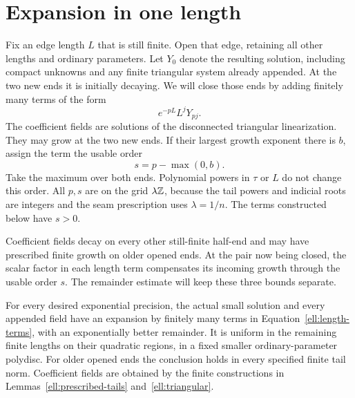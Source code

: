 \section{Expansion in one length}
\label{ell:length-expansion}

Fix an edge length $L$ that is still finite.  Open that edge,
retaining all other lengths and ordinary parameters.  Let $Y_0$
denote the resulting solution, including compact unknowns and
any finite triangular system already appended.  At the two
new ends it is initially decaying.  We will close those ends
by adding finitely many terms of the form
\begin{equation}
                       e^{-pL}L^jY_{pj}.
 \label{ell:length-terms}
\end{equation}
The coefficient fields are solutions of the disconnected
triangular linearization.  They may grow at the two new ends.
If their largest growth exponent there is $b$, assign the term
the usable order
\begin{equation}
                 s=p-\max(0,b).
 \label{ell:usable-order}
\end{equation}
Take the maximum over both ends.  Polynomial powers in $\tau$
or $L$ do not change this order.  All $p,s$ are on the grid
$\lambda\mathbb{Z}$, because the tail powers and indicial roots are
integers and the seam prescription uses $\lambda=1/n$.
The terms constructed below have $s>0$.

Coefficient fields decay on every other still-finite half-end and
may have prescribed finite growth on older opened ends. At the
pair now being closed, the scalar factor in each length term
compensates its incoming growth through the usable order $s$.
The remainder estimate will keep these three bounds separate.

\begin{lemma}
\label{ell:one-length}
For every desired exponential precision, the actual small
solution and every appended field have an expansion by finitely
many terms in Equation~\eqref{ell:length-terms}, with an
exponentially better remainder.  It is uniform in the remaining
finite lengths on their quadratic regions, in a fixed smaller
ordinary-parameter polydisc.  For older opened ends the conclusion
holds in every specified finite tail norm.  Coefficient fields
are obtained by the finite constructions in
Lemmas~\ref{ell:prescribed-tails} and~\ref{ell:triangular}.
\end{lemma}

